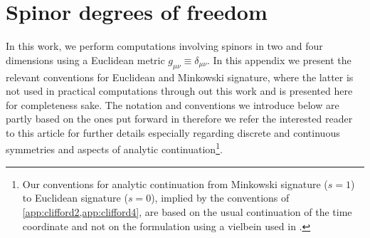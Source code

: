 \section{Spinor degrees of freedom}\label{app:spinors}
In this work, we perform computations involving spinors in two and four dimensions using a Euclidean metric $g_{\mu\nu}\equiv\delta_{\mu\nu}$.
In this appendix we present the relevant conventions for Euclidean and Minkowski signature, where the latter is not used in practical computations through out this work and is presented here for completeness sake.
The notation and conventions we introduce below are partly based on the ones put forward in  therefore we refer the interested reader to this article for further details especially regarding discrete and continuous symmetries and aspects of analytic continuation\footnote{%
	Our conventions for analytic continuation from Minkowski signature ($s = 1$) to Euclidean signature ($s=0$), implied by the conventions of \cref{app:clifford2,app:clifford4}, are based on the usual continuation of the time coordinate and not on the formulation using a vielbein used in .%
}.\bigskip

